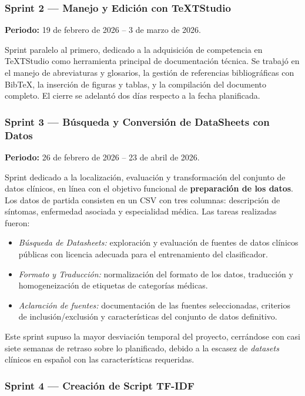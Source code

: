 \subsubsection*{Sprint 2 --- Manejo y Edición con TeXTStudio}

\textbf{Periodo:} 19 de febrero de 2026 -- 3 de marzo de 2026.

Sprint paralelo al primero, dedicado a la adquisición de competencia en TeXTStudio como herramienta principal de documentación técnica. Se trabajó en el manejo de abreviaturas y glosarios, la gestión de referencias bibliográficas con Bib\TeX{}, la inserción de figuras y tablas, y la compilación del documento completo. El cierre se adelantó dos días respecto a la fecha planificada.

\subsubsection*{Sprint 3 --- Búsqueda y Conversión de DataSheets con Datos}

\textbf{Periodo:} 26 de febrero de 2026 -- 23 de abril de 2026.

Sprint dedicado a la localización, evaluación y transformación del conjunto de datos clínicos, en línea con el objetivo funcional de \textbf{preparación de los datos}. Los datos de partida consisten en un CSV con tres columnas: descripción de síntomas, enfermedad asociada y especialidad médica. Las tareas realizadas fueron:

\begin{itemize}
	\item \textit{Búsqueda de Datasheets:} exploración y evaluación de fuentes de datos clínicos públicas con licencia adecuada para el entrenamiento del clasificador.
	\item \textit{Formato y Traducción:} normalización del formato de los datos, traducción y homogeneización de etiquetas de categorías médicas.
	\item \textit{Aclaración de fuentes:} documentación de las fuentes seleccionadas, criterios de inclusión/exclusión y características del conjunto de datos definitivo.
\end{itemize}

Este sprint supuso la mayor desviación temporal del proyecto, cerrándose con casi siete semanas de retraso sobre lo planificado, debido a la escasez de \textit{datasets} clínicos en español con las características requeridas.

\subsubsection*{Sprint 4 --- Creación de Script TF-IDF}

